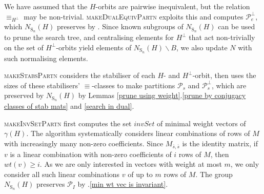 \documentclass[11pt,a4paper]{article}
\theoremstyle{definition}
\theoremstyle{remark}
\newcommand{\Sy}{\mathrm{S}}
\begin{document}
We have assumed that the $H$-orbits are pairwise inequivalent, but the relation $\equiv_{H^{\bot}}$ may be non-trivial. \textsc{makeDualEquivPartn} exploits this and computes $\mathcal{P}_e^{\bot}$, which $N_{\Sy_n}(H)$ preserves by . 
Since known subgroups of $N_{\Sy_n}(H)$ can be used to prune the search tree, and centralising elements for $H^{\bot}$ that act non-trivially on the set of $H^{\bot}$-orbits yield elements of $N_{\Sy_n}(H)\backslash B$, we also update $N$ with such normalising elements. 

\textsc{makeStabsPartn} considers the stabiliser of each $H$- and $H^{\bot}$-orbit, then uses the sizes of these stabilisers' $\equiv$-classes to make partitions $\mathcal{P}_s$ and $\mathcal{P}_s^{\bot}$, which are preserved by $N_{\Sy_n}(H)$ by Lemmas \ref{prune using weight}.\ref{prune by conjugacy classes of stab mats} and \ref{search in dual}. 

\textsc{makeInvSetPartn} first computes 
the set $invSet$ of minimal weight vectors of $\gamma(H)$. 
The algorithm systematically considers linear combinations of rows of $M$ with increasingly many non-zero coefficients. 
Since $M_{\overline{s},\overline{s}}$ is the identity matrix, 
if $v$ is a linear combination with non-zero coefficients of $i$ rows of $M$, then $wt(v) \geq i$. As we are only interested in vectors with weight at most $m$, we only consider all such linear combinations $v$ of up to $m$ rows of $M$. 
The group $N_{\Sy_n}(H)$ preserves $\mathcal{P}_I$ by .\ref{min wt vec is invariant}. 
\end{document}
